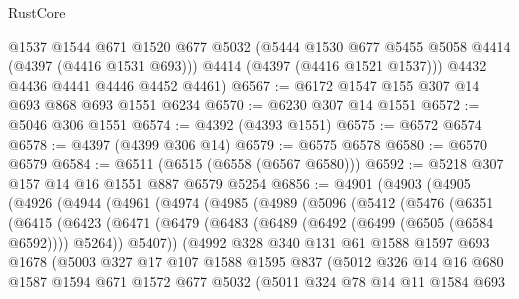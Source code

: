\begin{lexlean}{RustCore}
\begin{coremodule}
        @1537
        @1544
        @671
        @1520
        @677
        @5032
        (@5444 @1530 @677 @5455 @5058 @4414 (@4397 (@4416 @1531 @693)))
        @4414
        (@4397 (@4416 @1521 @1537)))
      @4432
      @4436
      @4441
      @4446
      @4452
      @4461)
@6567 := @6172 @1547 @155 @307 @14 @693 @868 @693 @1551 @6234
@6570 := @6230 @307 @14 @1551
@6572 := @5046 @306 @1551
@6574 := @4392 (@4393 @1551)
@6575 := @6572 @6574
@6578 := @4397 (@4399 @306 @14)
@6579 := @6575 @6578
@6580 := @6570 @6579
@6584 := @6511 (@6515 (@6558 (@6567 @6580)))
@6592 := @5218 @307 @157 @14 @16 @1551 @887 @6579 @5254
@6856 := @4901
    (@4903
      (@4905
        (@4926
          (@4944
            (@4961
              (@4974
                (@4985
                  (@4989
                    (@5096
                      (@5412
                        (@5476
                          (@6351
                            (@6415
                              (@6423
                                (@6471
                                  (@6479
                                    (@6483 (@6489 (@6492 (@6499 (@6505 (@6584 @6592)))) @5264))
                                    @5407))
                                (@4992
                                  @328
                                  @340
                                  @131
                                  @61
                                  @1588
                                  @1597
                                  @693
                                  @1678
                                  (@5003
                                    @327
                                    @17
                                    @107
                                    @1588
                                    @1595
                                    @837
                                    (@5012
                                      @326
                                      @14
                                      @16
                                      @680
                                      @1587
                                      @1594
                                      @671
                                      @1572
                                      @677
                                      @5032
                                      (@5011
                                        @324
                                        @78
                                        @14
                                        @11
                                        @1584
                                        @693

\end{coremodule}
\end{lexlean}
